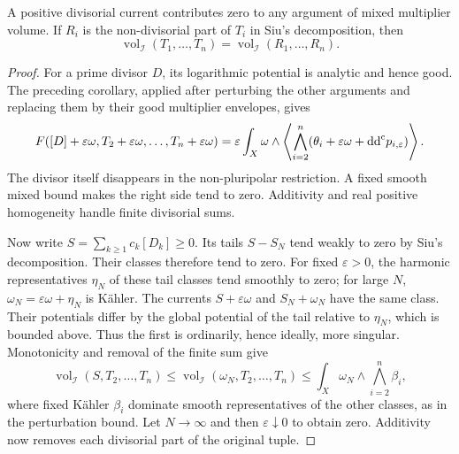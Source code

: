 \begin{proposition}\label{prop:mixed-multiplier-volume-divisorial-removal}
A positive divisorial current contributes zero to any argument of mixed multiplier volume. If $R_i$ is the non-divisorial part of $T_i$ in Siu's decomposition, then
\[
 \operatorname{vol}_{\mathcal I}(T_1,\ldots,T_n)
                              =\operatorname{vol}_{\mathcal I}(R_1,\ldots,R_n).
\]
\end{proposition}
\begin{proof}
For a prime divisor $D$, its logarithmic potential is analytic and hence good. The preceding corollary, applied after perturbing the other arguments and replacing them by their good multiplier envelopes, gives
\[
 F([D]+\varepsilon\omega,T_2+\varepsilon\omega,\ldots,T_n+\varepsilon\omega)
     =\varepsilon\int_X\omega\wedge
         \left\langle\bigwedge_{i=2}^n(\theta_i+\varepsilon\omega+\mathrm{dd}^{\mathrm{c}} p_{i,\varepsilon})\right\rangle.
\]
The divisor itself disappears in the non-pluripolar restriction. A fixed smooth mixed bound makes the right side tend to zero. Additivity and real positive homogeneity handle finite divisorial sums.

Now write $S=\sum_{k\geq1}c_k[D_k]\geq0$. Its tails $S-S_N$ tend weakly to zero by Siu's decomposition. Their classes therefore tend to zero. For fixed $\varepsilon>0$, the harmonic representatives $\eta_N$ of these tail classes tend smoothly to zero; for large $N$, $\omega_N=\varepsilon\omega+\eta_N$ is K\"ahler. The currents $S+\varepsilon\omega$ and $S_N+\omega_N$ have the same class. Their potentials differ by the global potential of the tail relative to $\eta_N$, which is bounded above. Thus the first is ordinarily, hence ideally, more singular. Monotonicity and removal of the finite sum give
\[
 \operatorname{vol}_{\mathcal I}(S,T_2,\ldots,T_n)
    \leq\operatorname{vol}_{\mathcal I}(\omega_N,T_2,\ldots,T_n)
    \leq\int_X\omega_N\wedge\bigwedge_{i=2}^n\beta_i,
\]
where fixed K\"ahler $\beta_i$ dominate smooth representatives of the other classes, as in the perturbation bound. Let $N\to\infty$ and then $\varepsilon\downarrow0$ to obtain zero. Additivity now removes each divisorial part of the original tuple.
\end{proof}

